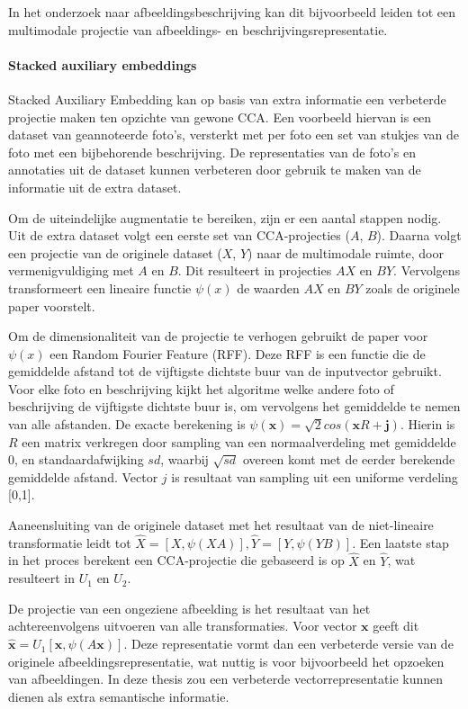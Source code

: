 In het onderzoek naar afbeeldingsbeschrijving kan dit bijvoorbeeld leiden tot een multimodale projectie van afbeeldings- en beschrijvingsrepresentatie.

\paragraph{Stacked auxiliary embeddings}

Stacked Auxiliary Embedding\cite{Gong2014} kan op basis van extra informatie een verbeterde projectie maken ten opzichte van gewone CCA. Een voorbeeld hiervan is een dataset van geannoteerde foto's, versterkt met per foto een set van stukjes van de foto met een bijbehorende beschrijving. De representaties van de foto's en annotaties uit de dataset kunnen verbeteren door gebruik te maken van de informatie uit de extra dataset.

Om de uiteindelijke augmentatie te bereiken, zijn er een aantal stappen nodig. Uit de extra dataset volgt een eerste set van CCA-projecties ($A$, $B$). Daarna volgt een projectie van de originele dataset ($X$, $Y$) naar de multimodale ruimte, door vermenigvuldiging met $A$ en $B$. Dit resulteert in projecties $AX$ en $BY$. Vervolgens transformeert een lineaire functie $\psi(x)$ de waarden $AX$ en $BY$ zoals de originele paper voorstelt.

Om de dimensionaliteit van de projectie te verhogen gebruikt de paper voor $\psi(x)$ een Random Fourier Feature (RFF). Deze RFF is een functie die de gemiddelde afstand tot de vijftigste dichtste buur van de inputvector gebruikt. Voor elke foto en beschrijving kijkt het algoritme welke andere foto of beschrijving de vijftigste dichtste buur is, om vervolgens het gemiddelde te nemen van alle afstanden. De exacte berekening is $\psi(\mathbf{x})=\sqrt{2}cos(\mathbf{x}R+\mathbf{j})$. Hierin is $R$ een matrix verkregen door sampling van een normaalverdeling met gemiddelde 0, en standaardafwijking $sd$, waarbij $\sqrt{sd}$ overeen komt met de eerder berekende gemiddelde afstand. Vector $j$ is resultaat van sampling uit een uniforme verdeling [0,1].

Aaneensluiting van de originele dataset met het resultaat van de niet-lineaire transformatie leidt tot $\hat{X} = [X, \psi(XA)], \hat{Y} = [Y, \psi(YB)]$. Een laatste stap in het proces berekent een CCA-projectie die gebaseerd is op $\hat{X}$ en $\hat{Y}$, wat resulteert in $U_1$ en $U_2$.

De projectie van een ongeziene afbeelding is het resultaat van het achtereenvolgens uitvoeren van alle transformaties. Voor vector $\mathbf{x}$ geeft dit $\mathbf{\hat{x}} = U_1[\mathbf{x}, \psi(A\mathbf{x})]$. Deze representatie vormt dan een verbeterde versie van de originele afbeeldingsrepresentatie, wat nuttig is voor bijvoorbeeld het opzoeken van afbeeldingen. In deze thesis zou een verbeterde vectorrepresentatie kunnen dienen als extra semantische informatie. 

